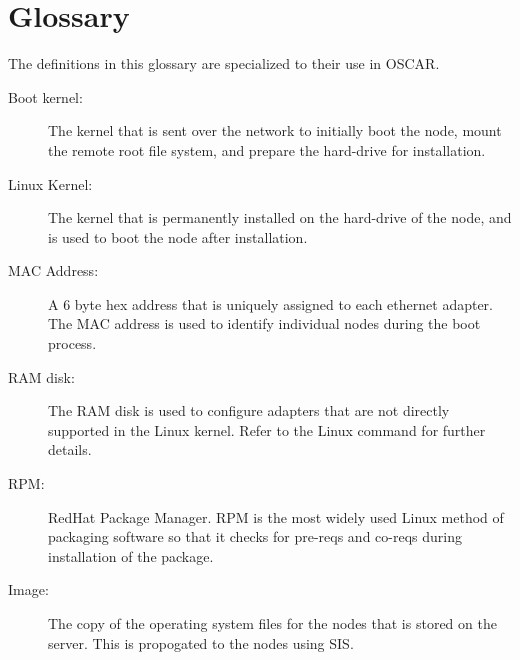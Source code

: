 \documentclass[letterpaper,11pt]{article}
\begin{document}
\section*{Glossary}
The definitions in this glossary are specialized to their use in
OSCAR.
\begin{description}
        \item[Boot kernel:] The kernel that is sent over the network to
        initially boot the node, mount the remote root file system, and
        prepare the hard-drive for installation.

        \item[Linux Kernel:] The kernel that is permanently installed on
        the hard-drive of the node, and is used to boot the node after
        installation.

        \item[MAC Address:] A 6 byte hex address that is uniquely assigned
        to each ethernet adapter.  The MAC address is used to identify
        individual nodes during the boot process.

        \item[RAM disk:] The RAM disk is used to configure adapters that
        are not directly supported in the Linux kernel.  Refer to the
        Linux  command for further details.

        \item[RPM:] RedHat Package Manager.  RPM is the most widely used
        Linux method of packaging software so that it checks for pre-reqs
        and co-reqs during installation of the package.

        \item[Image:] The copy of the operating system files for the nodes
        that is stored on the server. This is propogated to the nodes using
        SIS.
\end{description}
\end{document}
